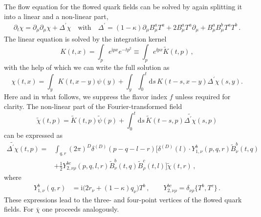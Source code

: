 The flow equation  for the flowed quark fields can be
solved by again splitting it into a linear and a non-linear part,
\begin{align}
  \partial_t \chi =\partial_\mu \partial_\mu \chi + \Delta^\prime \chi
  \quad \textrm{with} \quad \Delta^\prime = (1-\kappa) \partial_\mu
  B_\mu^a T^a + 2 B_\mu^a T^a \partial_\mu + B_\mu^a B_\mu^b T^a T^b\,.
\end{align}
The linear equation is solved by the integration kernel
\begin{equation}
  K(t,x)=\int_p e^{\mathrm{i}px} e^{-tp^2} \equiv \int_p e^{\ii
    px}\widetilde K(t,p)\,,
  \label{eq:k}
\end{equation}
with the help of which we can write the full solution as
\begin{equation}
  \chi(t,x)= \int_y K(t,x-y)\psi(y) + \int_y \int_0^t \mathrm{d}s \, K(t-s,x-y) \Delta^\prime \chi(s,y).
\end{equation}
Here and in what follows, we suppress the flavor index $f$ unless
required for clarity.  The non-linear part of the Fourier-transformed
field
\begin{equation}
  \widetilde{\chi}(t,p)= \widetilde{K}(t,p)\widetilde{\psi}(p) + \int_0^t \mathrm{d}s \, \widetilde{K}(t-s,p)\widetilde{\Delta^\prime \chi}(s,p)
  \label{eq:quark_solution_momentum}
\end{equation}
can be expressed as
\begin{equation}
  \begin{split}
    \widetilde{\Delta^\prime \chi}(t,p) =&
    \int_{q,r} (2\pi)^D \delta^{(D)}(p-q-l-r)\bigg[
      \delta^{(D)}(l)\cdot Y_{1,\nu}^{b}(p,q,r)
      \widetilde{B}_{\nu}^{b}(t,q)
      \\&+
    \frac{1}{2}
    Y_{2,\nu\rho}^{bc}(p,q,l,r)
    \widetilde{B}_{\nu}^{b}(t,q)
    \widetilde{B}_{\rho}^{c}(t,l)\bigg] \widetilde{\chi}(t,r)\,,
  \end{split}
\end{equation}
where
\begin{equation}
  \begin{split}
  Y_{1,\nu}^b(q,r) &= \mathrm{i} \big( 2 r_\nu + (1-\kappa) q_\nu \big)
  T^b\,,\qquad
  Y_{2,\nu\rho}^{bc} = \delta_{\nu\rho} \bigl\{ T^{b}, T^{c} \bigr\}\,.
  \end{split}
\end{equation}
These expressions lead to the three- and four-point vertices of
the flowed quark fields. For $\bar{\chi}$ one proceeds analogously.



